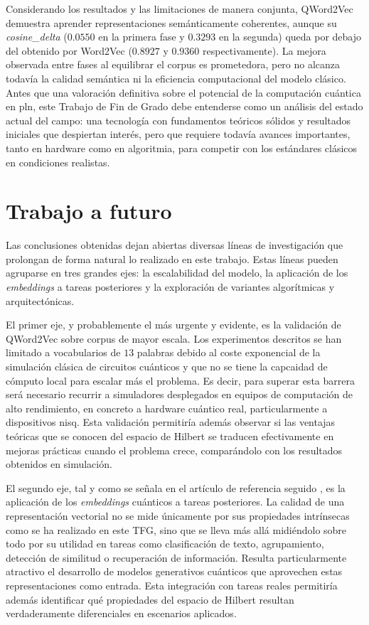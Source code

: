 Considerando los resultados y las limitaciones de manera conjunta, QWord2Vec demuestra aprender representaciones semánticamente coherentes, aunque su \textit{cosine\_delta} ($0.0550$ en la primera fase y $0.3293$ en la segunda) queda por debajo del obtenido por Word2Vec ($0.8927$ y $0.9360$ respectivamente). La mejora observada entre fases al equilibrar el corpus es prometedora, pero no alcanza todavía la calidad semántica ni la eficiencia computacional del modelo clásico. Antes que una valoración definitiva sobre el potencial de la computación cuántica en \gls{pln}, este Trabajo de Fin de Grado debe entenderse como un análisis del estado actual del campo: una tecnología con fundamentos teóricos sólidos y resultados iniciales que despiertan interés, pero que requiere todavía avances importantes, tanto en hardware como en algoritmia, para competir con los estándares clásicos en condiciones realistas.


\section{Trabajo a futuro}

Las conclusiones obtenidas dejan abiertas diversas líneas de investigación que prolongan de forma natural lo realizado en este trabajo. Estas líneas pueden agruparse en tres grandes ejes: la escalabilidad del modelo, la aplicación de los \textit{embeddings} a tareas posteriores y la exploración de variantes algorítmicas y arquitectónicas.

El primer eje, y probablemente el más urgente y evidente, es la validación de QWord2Vec sobre corpus de mayor escala. Los experimentos descritos se han limitado a vocabularios de $13$ palabras debido al coste exponencial de la simulación clásica de circuitos cuánticos y que no se tiene la capcaidad de cómputo local para escalar más el problema. Es decir, para superar esta barrera será necesario recurrir a simuladores desplegados en equipos de computación de alto rendimiento, en concreto a hardware cuántico real, particularmente a dispositivos \gls{nisq}. Esta validación permitiría además observar si las ventajas teóricas que se conocen del espacio de Hilbert se traducen efectivamente en mejoras prácticas cuando el problema crece, comparándolo con los resultados obtenidos en simulación.

El segundo eje, tal y como se señala en el artículo de referencia seguido \cite{ohno_qword2vec_2025}, es la aplicación de los \textit{embeddings} cuánticos a tareas posteriores. La calidad de una representación vectorial no se mide únicamente por sus propiedades intrínsecas como se ha realizado en este TFG, sino que se lleva más allá midiéndolo sobre todo por su utilidad en tareas como clasificación de texto, agrupamiento, detección de similitud o recuperación de información. Resulta particularmente atractivo el desarrollo de modelos generativos cuánticos que aprovechen estas representaciones como entrada. Esta integración con tareas reales permitiría además identificar qué propiedades del espacio de Hilbert resultan verdaderamente diferenciales en escenarios aplicados.

